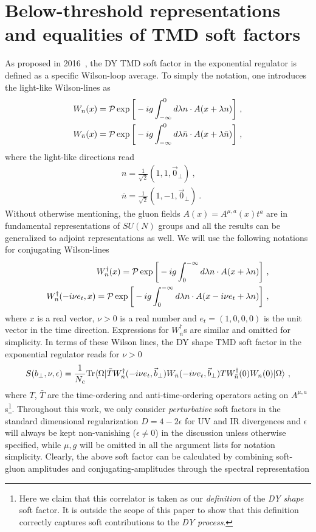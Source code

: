 \documentclass[a4paper,11pt]{article}
\begin{document}
\section{Below-threshold representations and  equalities of TMD soft factors}\label{sec:exp}
As proposed in 2016~\cite{Li:2016axz}, the DY TMD soft factor in the exponential regulator is defined as a specific Wilson-loop average. To simply the notation, one introduces the light-like Wilson-lines as
\begin{align}
W_n(x)={\cal P}\exp \bigg[-ig\int_{-\infty}^0 d\lambda n\cdot A(x+\lambda n)\bigg] \ , \\
W_{\bar n}(x)={\cal P}\exp \bigg[-ig\int_{-\infty}^0 d\lambda \bar n\cdot A(x+\lambda \bar n)\bigg] \ ,
\end{align}
where the light-like directions read
\begin{align}
&n=\frac{1}{\sqrt{2}}(1,1,\vec{0}_\perp) \ ,  \\
&\bar n=\frac{1}{\sqrt{2}}(1,-1,\vec{0}_\perp) \ .
\end{align}
Without otherwise mentioning, the gluon fields $A(x)=A^{\mu,a}(x)t^a$ are in fundamental representations of $SU(N)$ groups and all the results can be generalized to adjoint representations as well. We will use the following notations for conjugating Wilson-lines
\begin{align}
W_n^{\dagger}(x)={\cal P}\exp \bigg[-ig\int_{0}^{-\infty} d\lambda n\cdot A(x+\lambda n)\bigg] \ , \label{eq:conjuW1} \\
W_n^{\dagger}(-i\nu e_t,x)={\cal P}\exp \bigg[-ig\int_{0}^{-\infty} d\lambda n\cdot A(x-i\nu e_t +\lambda n)\bigg] \ , \label{eq:conjuW2}
\end{align}
where $x$ is a real vector, $\nu>0$ is a real number and $e_t=(1,0,0,0)$ is the unit vector in the time direction. Expressions for $W_{\bar n}^{\dagger}$s are similar and omitted for simplicity. In terms of these Wilson lines, the DY shape TMD soft factor in the exponential regulator reads for $\nu>0$
\begin{align}\label{eq:defexp}
S(b_\perp,\nu,\epsilon)=\frac{1}{N_c}{\rm Tr}\langle \Omega|\bar{T} W_n^{\dagger}(-i\nu e_t,\vec{b}_\perp)W_{\bar n}(-i\nu e_t,\vec{b}_\perp)TW_{\bar n}^{\dagger}(0)W_{n}(0)|\Omega\rangle \ ,
\end{align}
where $T$, $\bar T $ are the time-ordering and anti-time-ordering operators acting on $A^{\mu,a}$s\footnote{Here we claim that this correlator is taken as our {\it definition} of the {\it DY shape} soft factor. It is outside the scope of this paper to show that this definition correctly captures soft contributions to the {\it DY process}.}. Throughout this work, we only consider {\it perturbative} soft factors in the standard dimensional regularization $D=4-2\epsilon$ for UV and IR divergences and $\epsilon$ will always be kept non-vanishing ($\epsilon \ne 0$) in the discussion unless otherwise specified, while $\mu,g$ will be omitted in all the argument lists for notation simplicity. Clearly, the above soft factor can be calculated by combining soft-gluon amplitudes and conjugating-amplitudes through the spectral representation
\end{document}
